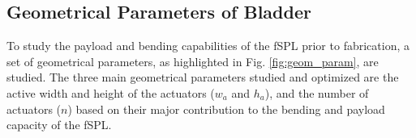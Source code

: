 \documentclass[letterpaper, 10 pt, conference]{ieeeconf}  %
\begin{document}












\subsection{Geometrical Parameters of Bladder }
% 
% 
To study the payload and bending capabilities of the fSPL prior to fabrication, a set of geometrical parameters, as highlighted in Fig. \ref{fig:geom_param}, are studied. The three main geometrical parameters studied and optimized are the active width and height of the actuators ($w_{a}$ and $h_{a}$), and the number of actuators ($n$) based on their major contribution to the bending and payload capacity of the fSPL.
\end{document}
